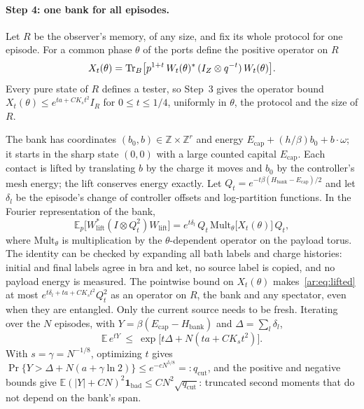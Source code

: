 \paragraph{Step 4: one bank for all episodes.} Let $R$ be the observer's memory, of any size, and fix its whole protocol for one episode. For a common phase $\theta$ of the ports define the positive operator on $R$
\[
X_t(\theta)=\operatorname{Tr}_B\bigl[p^{1+t}\,W_t(\theta)^*\,(I_Z\otimes q^{-t})\,W_t(\theta)\bigr].
\]
Every pure state of $R$ defines a tester, so Step~3 gives the operator bound $X_t(\theta)\le e^{ta+CK_st^2}I_R$ for $0\le t\le1/4$, uniformly in $\theta$, the protocol and the size of $R$.

The bank has coordinates $(b_0,b)\in\mathbb Z\times\mathbb Z^r$ and energy $E_{\mathrm{cap}}+(h/\beta)b_0+b\cdot\omega$; it starts in the sharp state $(0,0)$ with a large counted capital $E_{\mathrm{cap}}$. Each contact is lifted by translating $b$ by the charge it moves and $b_0$ by the controller's mesh energy; the lift conserves energy exactly. Let $Q_t=e^{-t\beta(H_{\mathrm{bank}}-E_{\mathrm{cap}})/2}$ and let $\delta_l$ be the episode's change of controller offsets and log-partition functions. In the Fourier representation of the bank,
\begin{equation}\label{ar:eq:lifted}
\mathbb E_p\bigl[W_{\mathrm{lift}}^*(I\otimes Q_t^2)W_{\mathrm{lift}}\bigr]=e^{t\delta_l}\,Q_t\,\mathrm{Mult}_\theta\bigl[X_t(\theta)\bigr]\,Q_t,
\end{equation}
where $\mathrm{Mult}_\theta$ is multiplication by the $\theta$-dependent operator on the payload torus. The identity can be checked by expanding all bath labels and charge histories: initial and final labels agree in bra and ket, no source label is copied, and no payload energy is measured. The pointwise bound on $X_t(\theta)$ makes~\eqref{ar:eq:lifted} at most $e^{t\delta_l+ta+CK_st^2}Q_t^2$ as an operator on $R$, the bank and any spectator, even when they are entangled. Only the current source needs to be fresh. Iterating over the $N$ episodes, with $Y=\beta(E_{\mathrm{cap}}-H_{\mathrm{bank}})$ and $\Delta=\sum_l\delta_l$,
\[
\mathbb E\,e^{tY}\ \le\ \exp\bigl[t\Delta+N(ta+CK_st^2)\bigr].
\]
With $s=\gamma=N^{-1/8}$, optimizing $t$ gives $\Pr\{Y>\Delta+N(a+\gamma\ln2)\}\le e^{-cN^{5/8}}=:q_{\mathrm{cut}}$, and the positive and negative bounds give $\mathbb E(|Y|+CN)^2\mathbf 1_{\mathrm{bad}}\le CN^2\sqrt{q_{\mathrm{cut}}}$: truncated second moments that do not depend on the bank's span.

